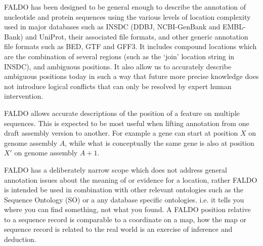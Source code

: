 FALDO has been designed to be general enough to describe the annotation
of nucleotide and protein sequences using the various levels of location complexity used
in major databases such as INSDC (DDBJ, NCBI-GenBank and EMBL-Bank) and UniProt, their
associated file formats, and other generic annotation file formats such as BED,
GTF and GFF3. It includes compound locations which are the combination of
several regions (such as the `join' location string in INSDC), and ambiguous
positions. It also allow us to accurately describe ambiguous positions today
in such a way that future more precise knowledge does not introduce logical conflicts 
that can only be resolved by expert human intervention.

FALDO allows accurate descriptions of the position of
a feature on multiple sequences.
This is expected to be most useful when lifting annotation from one
draft assembly version to another.
For example a gene can start at position $X$ on genome assembly $A$,
while what is conceptually the same gene is also at position $X'$ on genome assembly $A+1$.

FALDO has a deliberately narrow scope which does not address general annotation
issues about the meaning of or evidence for a location, rather FALDO is intended be
used in combination with other relevant ontologies such as the Sequence Ontology
(SO) \cite{SequenceOntology2005} or a any database specific ontologies. 
i.e. it tells you where you can find something, not what you found.
A FALDO position relative to a sequence record is comparable to a coordinate on a map, how the map or sequence record is related to the real world is an exercise of inference and deduction.